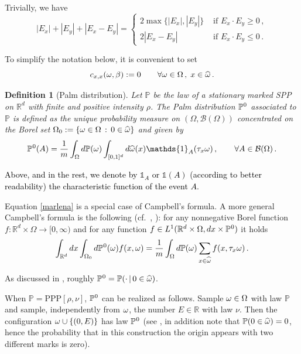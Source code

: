 \documentclass[12pt,a4paper,reqno]{amsart}
\newtheorem{Definition}[Theorem]{Definition}
\newcommand{\cB}{\ensuremath{\mathcal B}}
\newcommand{\bbP}{{\ensuremath{\mathbb P}} }
\newcommand{\bbR}{{\ensuremath{\mathbb R}} }
\let\O=\Omega \let\P=\Pi   \let\Ps=\Psi \let\Si=\Sigma \let\X=\Xi
\newcommand{\rosso}{\textcolor{black}} %
\newcommand{\vvv}{\textcolor{black}} %
\newcommand{\be}{\begin{equation}}
\newcommand{\en}{\end{equation}}
\newcommand{\vpz}{\vvv{\bbP^{\hspace{0.013cm}0} }}
\begin{document}
Trivially, we have 
\be\label{balzetto}
|E_x|+ |E_y|+ |E_x-E_y| = \begin{cases} 
2 \max \big\{ |E_x|,|E_y|\big\} & \text{ if } E_x \cdot E_y \geq 0 \,,\\
2 |E_x-E_y| & \text{ if } E_x \cdot E_y \leq 0\,.
\end{cases}
\en

To simplify the notation below, it is convenient to set 
\[
c_{x,x}(\o,\b):=0 \qquad \forall \o \in \O\,,\; x\in \widehat{\o}\,.
\]



\begin{Definition}[Palm distribution]  \label{def_palm} Let $\bbP$ be the law of a stationary  marked SPP on $\bbR^d$ with finite and positive  intensity $\rho$. The Palm distribution $\vpz$ associated to $\bbP$  is defined  as  the unique probability measure on  $(\O,\cB(\O))$  concentrated on the Borel set $\O_0:=\{\o\in \O\,:\, 0 \in \widehat \o\}$ and given by 
\begin{equation}\label{marlena}
\vpz(A)= \frac{1}{m} \int _{\O}d \bbP(\o)\int_{[0,1]^d}  d\widehat{\o} (x) \mathds{1}_A(\t_x \o)\,, \qquad \forall A \in \cB( \O) \,.
 \end{equation}
\end{Definition}
\rosso{Above, and in the rest, we denote by $\mathds{1}_A$ or $\mathds{1}(A)$ (according to better readability) the characteristic function of the event $A$.}

Equation \eqref{marlena} is a special case of Campbell's formula. A more general  Campbell's formula is the following (cf.~\cite[Eq.~(12.2.4)]{DV}, \cite[Thm.~1.2.8]{FKAS}): for any  nonnegative Borel function $f: \bbR^d\times \O \to[0,\infty) $   and for any function $f\in L^1( \bbR^d\times \O, dx \times \vpz)$ it holds 
 \begin{equation}\label{campanello}
 \int_{\bbR^d}dx  \int _{\O_0} d\vpz ( \o) f(x, \o) =\frac{1}{m} \int _{\O}d \bbP(\o)\sum_{x  \in \widehat{\o}} f(x, \t_x \o) \,.
 \end{equation}
 
As discussed  in \cite[Chapter~12]{DV}, roughly $\vpz=\bbP(\cdot\,|\, 0\in \widehat \o)$. 


When $\bbP=${\rm PPP}$[\rho,\nu]$, $\vpz$ can be realized as follows. Sample $\o\in \O$ with  law $\bbP$ and sample, independently from $\omega$, the number    $E\in \bbR $ with law $\nu$. Then 
the configuration $\omega \cup \{ (0,E)\}$ has law $\vpz$  (see \cite[Chapter~12]{DV}, in addition note that $\bbP( 0\in \widehat{\o})=0$, hence the probability that  in this construction  the origin appears with two different marks is zero). 
\end{document}
